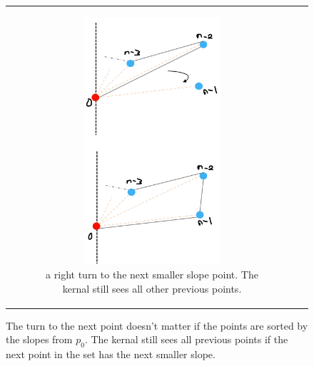 \documentclass [12pt]{article}
\begin{document}
\begin{enumerate}[label=(\alph*)]
\begin{figure}[h]
\begin{tabular}{cc}
\begin{subfigure}{0.5\textwidth}
                    \includegraphics[width=0.6\textwidth]{images/starb.PNG}
                    \caption{a right turn to the next smaller slope point. The kernal still sees all other previous points.}
                    \label{fig:starb}
                \end{subfigure}  
            \end{tabular}
            \caption{The turn to the next point doesn't matter if the points are sorted by the slopes from $p_0$. The kernal still sees all previous points if the next point in the set has the next smaller slope.}
            \label{fig:normalstar}
        \end{figure}


\end{enumerate}
\end{document}
